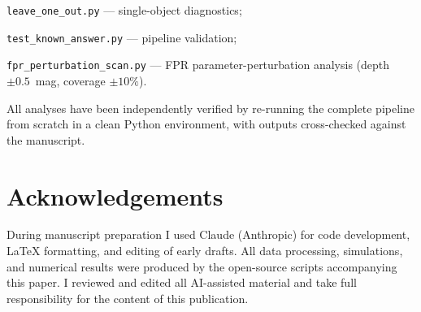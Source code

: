 \documentclass[usenatbib]{mnras}
\begin{document}
\noindent\texttt{leave\_one\_out.py} --- single-object diagnostics;

\noindent\texttt{test\_known\_answer.py} --- pipeline validation;

\noindent\texttt{fpr\_perturbation\_scan.py} --- FPR parameter-perturbation analysis (depth $\pm0.5$~mag, coverage $\pm10\%$).

\smallskip
\noindent All analyses have been independently verified by re-running the complete pipeline from scratch in a clean Python environment, with outputs cross-checked against the manuscript.

\section*{Acknowledgements}

During manuscript preparation I used Claude (Anthropic) for code
development, LaTeX formatting, and editing of early drafts. All data
processing, simulations, and numerical results were produced by the
open-source scripts accompanying this paper. I reviewed and edited all
AI-assisted material and take full responsibility for the content of
this publication.



\end{document}
